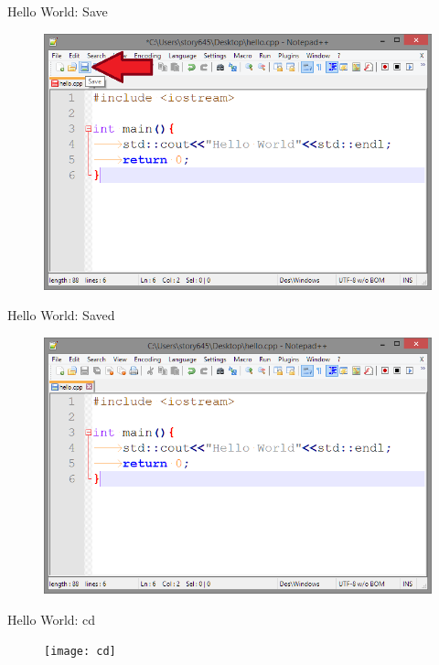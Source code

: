 \documentclass[xcolor={dvipsnames}]{beamer}
\begin{document}
\begin{frame}{Hello World: Save}
	\begin{figure}
			\includegraphics[width=1\textwidth]{save}
	\end{figure}
\end{frame}

\begin{frame}{Hello World: Saved}
	\begin{figure}
			\includegraphics[width=1\textwidth]{Saved}
	\end{figure}
\end{frame}

\begin{frame}{Hello World: cd}
	\begin{figure}
			\texttt{[image: cd]}
	\end{figure}
\end{frame}
\end{document}
